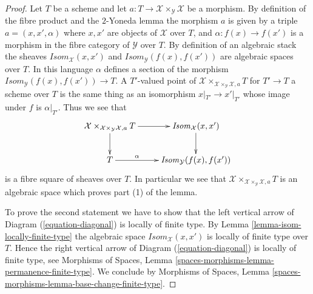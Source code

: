 \documentclass[10pt,a4paper]{amsart}
\theoremstyle{plain}
\theoremstyle{definition}
\theoremstyle{remark}
\numberwithin{equation}{subsection}
\begin{document}
\begin{proof}
Let $T$ be a scheme and let
$a : T \to \mathcal{X} \times_\mathcal{Y} \mathcal{X}$
be a morphism. By definition of the fibre product and the
$2$-Yoneda lemma the morphism $a$ is given by a triple
$a = (x, x', \alpha)$ where $x, x'$ are objects of $\mathcal{X}$
over $T$, and $\alpha : f(x) \to f(x')$ is a morphism in the fibre
category of $\mathcal{Y}$ over $T$. By definition of an algebraic
stack the sheaves $\mathit{Isom}_\mathcal{X}(x, x')$ and
$\mathit{Isom}_\mathcal{Y}(f(x), f(x'))$ are algebraic spaces
over $T$. In this language $\alpha$ defines a section of the morphism
$\mathit{Isom}_\mathcal{Y}(f(x), f(x')) \to T$. A $T'$-valued point of
$\mathcal{X} \times_{\mathcal{X} \times_\mathcal{Y} \mathcal{X}, a} T$
for $T' \to T$ a scheme over $T$ is the same thing as an isomorphism
$x|_{T'} \to x'|_{T'}$ whose image under $f$ is $\alpha|_{T'}$.
Thus we see that
\begin{equation}
\label{equation-diagonal}
\vcenter{
\xymatrix{
\mathcal{X} \times_{\mathcal{X} \times_\mathcal{Y} \mathcal{X}, a} T
\ar[d] \ar[r] &
\mathit{Isom}_\mathcal{X}(x, x') \ar[d] \\
T\ar[r]^-\alpha &
\mathit{Isom}_\mathcal{Y}(f(x), f(x'))
}
}
\end{equation}
is a fibre square of sheaves over $T$. In particular we see that
$\mathcal{X} \times_{\mathcal{X} \times_\mathcal{Y} \mathcal{X}, a} T$
is an algebraic space which proves part (1) of the lemma.

\medskip\noindent
To prove the second statement we have to show that the left
vertical arrow of Diagram (\ref{equation-diagonal}) is locally
of finite type. By
Lemma \ref{lemma-isom-locally-finite-type}
the algebraic space $\mathit{Isom}_\mathcal{X}(x, x')$
is locally of finite type over $T$. Hence the right vertical arrow of
Diagram (\ref{equation-diagonal}) is locally of finite type, see
Morphisms of Spaces, Lemma \ref{spaces-morphisms-lemma-permanence-finite-type}.
We conclude by
Morphisms of Spaces,
Lemma \ref{spaces-morphisms-lemma-base-change-finite-type}.
\end{proof}
\end{document}
